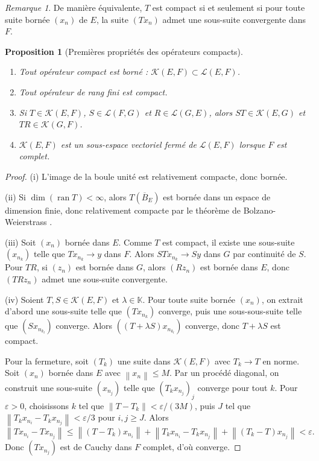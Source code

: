 \documentclass[a4paper,12pt]{book}
\DeclareMathOperator{\ran}{ran}
\newcommand{\K}{\mathbb{K}}
\newcommand{\norm}[1]{\left\| #1 \right\|}
\theoremstyle{definition}
\theoremstyle{plain}
\newtheorem{proposition}[definition]{Proposition}
\theoremstyle{remark}
\newtheorem{remarque}[definition]{Remarque}
\begin{document}
\begin{remarque}\label{rem:compact-suites}
De manière équivalente, $T$ est compact si et seulement si pour toute suite bornée
$(x_n)$ de $E$, la suite $(Tx_n)$ admet une sous-suite convergente dans $F$.
\end{remarque}

\begin{proposition}[Premières propriétés des opérateurs compacts]%
\label{prop:proprietes-compacts}
\begin{enumerate}[label=(\roman*)]
    \item Tout opérateur compact est borné : $\mathcal{K}(E,F) \subset \mathcal{L}(E,F)$.
    \item Tout opérateur de rang fini est compact.
    \item Si $T \in \mathcal{K}(E,F)$, $S \in \mathcal{L}(F,G)$ et
          $R \in \mathcal{L}(G,E)$, alors $ST \in \mathcal{K}(E,G)$ et
          $TR \in \mathcal{K}(G,F)$.
    \item $\mathcal{K}(E,F)$ est un sous-espace vectoriel fermé de $\mathcal{L}(E,F)$
          lorsque $F$ est complet.
\end{enumerate}
\end{proposition}

\begin{proof}
(i) L'image de la boule unité est relativement compacte, donc bornée.

(ii) Si $\dim(\ran T) < \infty$, alors $T(\overline{B}_E)$ est bornée dans un espace
de dimension finie, donc relativement compacte par le théorème de Bolzano-Weierstrass%
.

(iii) Soit $(x_n)$ bornée dans $E$. Comme $T$ est compact, il existe une sous-suite
$(x_{n_k})$ telle que $Tx_{n_k} \to y$ dans $F$. Alors $STx_{n_k} \to Sy$ dans $G$
par continuité de $S$. Pour $TR$, si $(z_n)$ est bornée dans $G$, alors $(Rz_n)$ est
bornée dans $E$, donc $(TRz_n)$ admet une sous-suite convergente.

(iv) Soient $T, S \in \mathcal{K}(E,F)$ et $\lambda \in \K$. Pour toute suite bornée
$(x_n)$, on extrait d'abord une sous-suite telle que $(Tx_{n_k})$ converge, puis une
sous-sous-suite telle que $(Sx_{n_{k_l}})$ converge. Alors
$((T + \lambda S)x_{n_{k_l}})$ converge, donc $T + \lambda S$ est compact.

Pour la fermeture, soit $(T_k)$ une suite dans $\mathcal{K}(E,F)$ avec $T_k \to T$
en norme. Soit $(x_n)$ bornée dans $E$ avec $\norm{x_n} \leq M$. Par un procédé
diagonal, on construit une sous-suite $(x_{n_j})$ telle que
$(T_k x_{n_j})_j$ converge pour tout $k$. Pour $\varepsilon > 0$, choisissons $k$
tel que $\norm{T - T_k} < \varepsilon / (3M)$, puis $J$ tel que
$\norm{T_k x_{n_i} - T_k x_{n_j}} < \varepsilon/3$ pour $i, j \geq J$. Alors
\[
    \norm{Tx_{n_i} - Tx_{n_j}} \leq \norm{(T-T_k)x_{n_i}} +
    \norm{T_k x_{n_i} - T_k x_{n_j}} + \norm{(T_k-T)x_{n_j}} < \varepsilon.
\]
Donc $(Tx_{n_j})$ est de Cauchy dans $F$ complet, d'où converge.
\end{proof}
\end{document}
